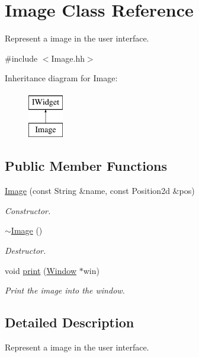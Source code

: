 \hypertarget{classImage}{}\section{Image Class Reference}
\label{classImage}


Represent a image in the user interface.  




{\ttfamily \#include $<$Image.\+hh$>$}

Inheritance diagram for Image\+:\begin{figure}[H]
\begin{center}
\leavevmode
\includegraphics[height=2.000000cm]{classImage}
\end{center}
\end{figure}
\subsection*{Public Member Functions}
\begin{DoxyCompactItemize}
\item 
\hyperlink{classImage_aca308a45e7c53ec95e244863cb31a738}{Image} (const String \&name, const Position2d \&pos)
\begin{DoxyCompactList}\small\item\em Constructor. \end{DoxyCompactList}\item 
\mbox{\label{classImage_a0294f63700543e11c0f0da85601c7ae5}} 
\hyperlink{classImage_a0294f63700543e11c0f0da85601c7ae5}{$\sim$\+Image} ()
\begin{DoxyCompactList}\small\item\em Destructor. \end{DoxyCompactList}\item 
void \hyperlink{classImage_aca043fb78326d6ce135498419e2d1833}{print} (\hyperlink{classWindow}{Window} $\ast$win)
\begin{DoxyCompactList}\small\item\em Print the image into the window. \end{DoxyCompactList}\end{DoxyCompactItemize}


\subsection{Detailed Description}
Represent a image in the user interface. 

